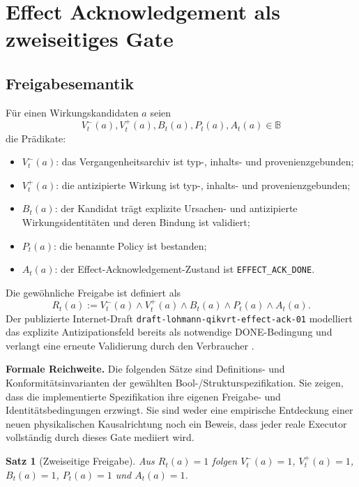 \documentclass[11pt,a4paper]{article}
\newtheorem{satz}{Satz}[section]
\theoremstyle{remark}
\newcommand{\DONE}{\texttt{EFFECT\_ACK\_DONE}}
\newcommand{\bool}{\mathbb{B}}
\newcommand{\statusbox}[2]{%
  \par\medskip\noindent
  \colorbox{#1}{\parbox{\dimexpr\linewidth-2\fboxsep\relax}{#2}}%
  \par\medskip
}
\begin{document}
\section{Effect Acknowledgement als zweiseitiges Gate}

\subsection{Freigabesemantik}

Für einen Wirkungskandidaten \(a\) seien
\[
  V_t^-(a),V_t^+(a),B_t(a),P_t(a),A_t(a)\in\bool
\]
die Prädikate:

\begin{itemize}
  \item \(V_t^-(a)\): das Vergangenheitsarchiv ist typ-, inhalts- und
  provenienzgebunden;
  \item \(V_t^+(a)\): die antizipierte Wirkung ist typ-, inhalts- und
  provenienzgebunden;
  \item \(B_t(a)\): der Kandidat trägt explizite Ursachen- und
  antizipierte Wirkungsidentitäten und deren Bindung ist validiert;
  \item \(P_t(a)\): die benannte Policy ist bestanden;
  \item \(A_t(a)\): der Effect-Acknowledgement-Zustand ist \DONE.
\end{itemize}

Die gewöhnliche Freigabe ist definiert als
\begin{equation}
  R_t(a)
  :=
  V_t^-(a)\land V_t^+(a)\land B_t(a)\land P_t(a)\land A_t(a).
  \label{eq:release}
\end{equation}
Der publizierte Internet-Draft
\nolinkurl{draft-lohmann-qikvrt-effect-ack-01} modelliert das explizite
Antizipationsfeld bereits als notwendige DONE-Bedingung und verlangt eine
erneute Validierung durch den Verbraucher
\cite{effectackdraft}.

\statusbox{QLight}{
\textbf{Formale Reichweite.}
Die folgenden Sätze sind Definitions- und Konformitätsinvarianten der
gewählten Bool-/Strukturspezifikation. Sie zeigen, dass die implementierte
Spezifikation ihre eigenen Freigabe- und Identitätsbedingungen erzwingt.
Sie sind weder eine empirische Entdeckung einer neuen physikalischen
Kausalrichtung noch ein Beweis, dass jeder reale Executor vollständig durch
dieses Gate mediiert wird.
}

\begin{satz}[Zweiseitige Freigabe]
\label{thm:two-boundary}
Aus \(R_t(a)=1\) folgen \(V_t^-(a)=1\), \(V_t^+(a)=1\),
\(B_t(a)=1\), \(P_t(a)=1\) und \(A_t(a)=1\).
\end{satz}
\end{document}
